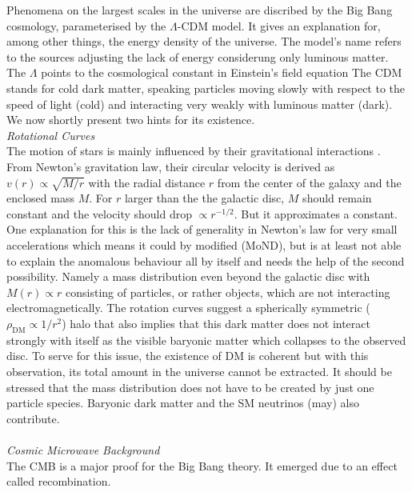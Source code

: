 Phenomena on the largest scales in the universe are discribed by the Big Bang cosmology, parameterised
by the $\Lambda$-CDM model. It \cite{LambdaCDM} gives an explanation for, among other things, the energy density of the 
universe. The model's name refers to the sources adjusting the lack of energy considerung only luminous matter. The $\Lambda$ points to the 
cosmological constant in Einstein's field equation
The CDM stands for cold dark matter, speaking particles moving slowly with respect to the speed of light (cold) and interacting very weakly with 
luminous matter (dark). We now shortly present two hints for its existence.
\\ \textit{Rotational Curves}\\
\noindent The motion of stars is mainly influenced by their gravitational interactions \cite{LectDMLis}. From Newton's gravitation law, their circular 
velocity is derived as
$v(r)\propto\sqrt{M/r}$ with the radial distance $r$ from the center of the galaxy and the enclosed mass $M$. For $r$ larger than the the galactic 
disc, $M$ should remain constant and the velocity should drop $\propto r^{-1/2}$. But %
it approximates a constant. One explanation for this
is the lack of generality in Newton's law for very small accelerations which means it could by modified (MoND), but is at least not able to 
explain the anomalous behaviour all by itself \cite{11015122}\cite{160607790} and needs the help of the second possibility. Namely a mass distribution even beyond the galactic
disc with $M(r)\propto r$ consisting of particles, or rather objects, which are not interacting electromagnetically. The rotation curves suggest a 
spherically symmetric ($\rho_\text{DM}\propto 1/r^2$) halo that also implies that this dark matter does not interact strongly with itself as the visible 
baryonic matter which collapses to the observed disc. To serve for this issue, the existence of DM is coherent but with this observation, its total 
amount in the 
universe cannot be extracted. It should be stressed that the mass distribution does not have to be created by just one particle species. Baryonic dark matter
and the SM neutrinos (may) also contribute. \\
\\ \textit{Cosmic Microwave Background}\\
\noindent The CMB is a major proof for the Big Bang theory. It emerged due to an effect called recombination. 
